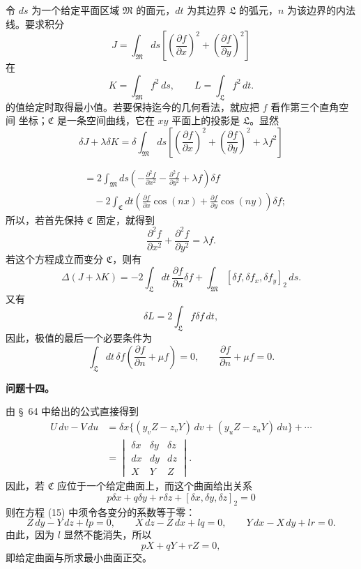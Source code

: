 \documentclass[11pt,a4paper,leqno]{article}
\begin{document}
令 $ds$ 为一个给定平面区域 $\mathfrak{M}$ 的面元，$dt$ 为其边界
$\mathfrak{L}$ 的弧元，$n$ 为该边界的内法线。要求积分
\[
J=\int_{\mathfrak{M}}ds
\left[\left(\frac{\partial f}{\partial x}\right)^2
+\left(\frac{\partial f}{\partial y}\right)^2\right]
\]
在
\[
K=\int_{\mathfrak{M}}f^2\,ds,\qquad
L=\int_{\mathfrak{L}}f^2\,dt.
\]
的值给定时取得最小值。若要保持迄今的几何看法，就应把 $f$ 看作第三个直角空间
坐标；$\mathfrak{C}$ 是一条空间曲线，它在 $xy$ 平面上的投影是
$\mathfrak{L}$。显然
\[
\delta J+\lambda\delta K
=\delta\int_{\mathfrak{M}}ds
\left[\left(\frac{\partial f}{\partial x}\right)^2
+\left(\frac{\partial f}{\partial y}\right)^2+\lambda f^2\right]
\]

\[
\begin{aligned}
&=2\int_{\mathfrak{M}}ds
\left(-\frac{\partial^2f}{\partial x^2}
-\frac{\partial^2f}{\partial y^2}+\lambda f\right)\delta f\\
&\quad-2\int_{\mathfrak{C}}dt
\left(\frac{\partial f}{\partial x}\cos(nx)
+\frac{\partial f}{\partial y}\cos(ny)\right)\delta f;
\end{aligned}
\]
所以，若首先保持 $\mathfrak{C}$ 固定，就得到
\[
\frac{\partial^2f}{\partial x^2}+\frac{\partial^2f}{\partial y^2}
=\lambda f.
\]
若这个方程成立而变分 $\mathfrak{C}$，则有
\[
\Delta(J+\lambda K)
=-2\int_{\mathfrak{L}}dt\,\frac{\partial f}{\partial n}\delta f
+\int_{\mathfrak{M}}[\delta f,\delta f_x,\delta f_y]_2\,ds.
\]
又有
\[
\delta L=2\int_{\mathfrak{L}}f\delta f\,dt,
\]
因此，极值的最后一个必要条件为
\[
\int_{\mathfrak{L}}dt\,\delta f
\left(\frac{\partial f}{\partial n}+\mu f\right)=0,\qquad
\frac{\partial f}{\partial n}+\mu f=0.
\]

\begin{center}
\textbf{问题十四。}
\end{center}

由 \S~64 中给出的公式直接得到
\[
\begin{aligned}
U\,dv-V\,du
&=\delta x\{(y_vZ-z_vY)\,dv+(y_uZ-z_uY)\,du\}+\cdots\\
&=\begin{vmatrix}
\delta x&\delta y&\delta z\\
dx&dy&dz\\
X&Y&Z
\end{vmatrix}.
\end{aligned}
\]
因此，若 $\mathfrak{C}$ 应位于一个给定曲面上，而这个曲面给出关系
\[
p\delta x+q\delta y+r\delta z+[\delta x,\delta y,\delta z]_2=0
\]
则在方程 (15) 中须令各变分的系数等于零：
\[
Z\,dy-Y\,dz+lp=0,\qquad X\,dz-Z\,dx+lq=0,\qquad
Y\,dx-X\,dy+lr=0.
\]
由此，因为 $l$ 显然不能消失，所以
\[
pX+qY+rZ=0,
\]
即给定曲面与所求最小曲面正交。
\end{document}
